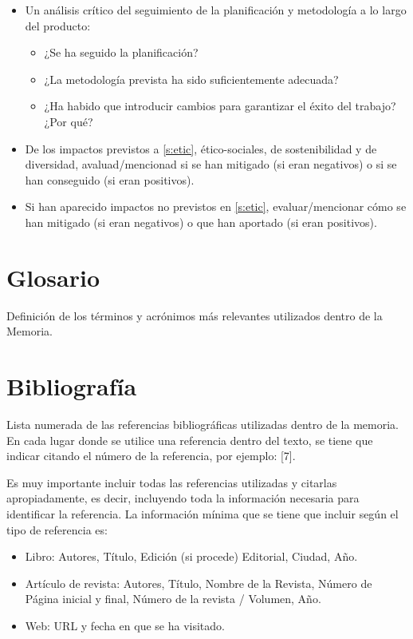 \documentclass[IB,BIB]{TFUOC}%
\begin{document}
\begin{itemize}
\item 
Un análisis crítico del seguimiento de la planificación y metodología a lo largo del producto:
\begin{itemize}
    \item ¿Se ha seguido la planificación?
    \item ¿La metodología prevista ha sido suficientemente adecuada?
    \item ¿Ha habido que introducir cambios para garantizar el éxito del trabajo? ¿Por qué? 
\end{itemize}
\item De los impactos previstos a \ref{s:etic}, ético-sociales, de sostenibilidad y de diversidad, avaluad/mencionad si se han mitigado (si eran negativos) o si se han conseguido (si eran positivos). 
\item Si han aparecido impactos no previstos en \ref{s:etic}, evaluar/mencionar cómo se han mitigado (si eran negativos) o que han aportado (si eran positivos).
\end{itemize}


\chapter{Glosario}

Definición de los términos y acrónimos más relevantes utilizados dentro de la Memoria.


\chapter{Bibliografía}

Lista numerada de las referencias bibliográficas utilizadas dentro de la memoria. En cada lugar donde se utilice una referencia dentro del texto, se tiene que indicar citando el número de la referencia, por ejemplo: [7].

Es muy importante incluir todas las referencias utilizadas y citarlas apropiadamente, es decir, incluyendo toda la información necesaria para identificar la referencia. La información mínima que se tiene que incluir según el tipo de referencia es:

\begin{itemize}
\item Libro: Autores, Título, Edición (si procede) Editorial, Ciudad, Año.
\item  Artículo de revista: Autores, Título, Nombre de la Revista, Número de Página inicial y final, Número de la revista / Volumen, Año.
\item  Web: URL y fecha en que se ha visitado.
\end{itemize}
\end{document}
